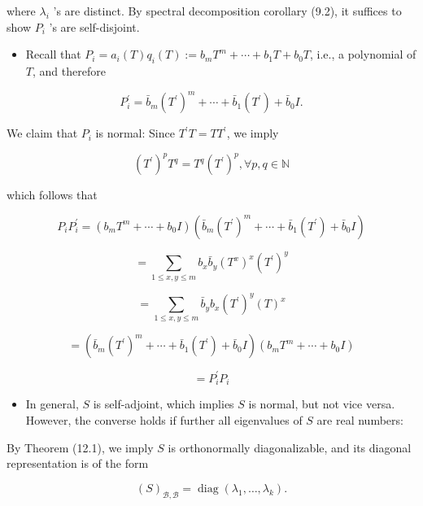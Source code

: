 \documentclass[11pt]{article}
\begin{document}
where \({\lambda }_{i}\) ’s are distinct. By spectral decomposition corollary (9.2), it suffices to show \({P}_{i}\) ’s are self-disjoint.

\begin{itemize}
\item Recall that \({P}_{i} = {a}_{i}\left( T\right) {q}_{i}\left( T\right)  \mathrel{\text{ := }} {b}_{m}{T}^{m} + \cdots  + {b}_1T + {b}_{0}T\), i.e., a polynomial of \(T\), and therefore
\end{itemize}

\[
{P}_{i}^{\prime } = {\bar{b}}_{m}{\left( {T}^{\prime }\right) }^{m} + \cdots  + {\bar{b}}_1\left( {T}^{\prime }\right)  + {\bar{b}}_{0}I.
\]

We claim that \({P}_{i}\) is normal: Since \({T}^{\prime }T = T{T}^{\prime }\), we imply

\[
{\left( {T}^{\prime }\right) }^{p}{T}^{q} = {T}^{q}{\left( {T}^{\prime }\right) }^{p},\forall p,q \in  \mathbb{N}
\]

which follows that

\[
{P}_{i}{P}_{i}^{\prime } = \left( {{b}_{m}{T}^{m} + \cdots  + {b}_{0}I}\right) \left( {{\bar{b}}_{m}{\left( {T}^{\prime }\right) }^{m} + \cdots  + {\bar{b}}_1\left( {T}^{\prime }\right)  + {\bar{b}}_{0}I}\right)
\]

\[
= \mathop{\sum }\limits_{{1 \leq  x,y \leq  m}}{b}_{x}{\bar{b}}_{y}{\left( {T}^{x}\right) }^{x}{\left( {T}^{\prime }\right) }^{y}
\]

\[
= \mathop{\sum }\limits_{{1 \leq  x,y \leq  m}}{\bar{b}}_{y}{b}_{x}{\left( {T}^{\prime }\right) }^{y}{\left( T\right) }^{x}
\]

\[
= \left( {{\bar{b}}_{m}{\left( {T}^{\prime }\right) }^{m} + \cdots  + {\bar{b}}_1\left( {T}^{\prime }\right)  + {\bar{b}}_{0}I}\right) \left( {{b}_{m}{T}^{m} + \cdots  + {b}_{0}I}\right)
\]

\[
= {P}_{i}^{\prime }{P}_{i}
\]

\begin{itemize}
\item In general, \(S\) is self-adjoint, which implies \(S\) is normal, but not vice versa. However, the converse holds if further all eigenvalues of \(S\) are real numbers:
\end{itemize}

By Theorem (12.1), we imply \(S\) is orthonormally diagonalizable, and its diagonal representation is of the form

\[
{\left( S\right) }_{\mathcal{B},\mathcal{B}} = \operatorname{diag}\left( {{\lambda }_1,\ldots ,{\lambda }_{k}}\right) .
\]
\end{document}
